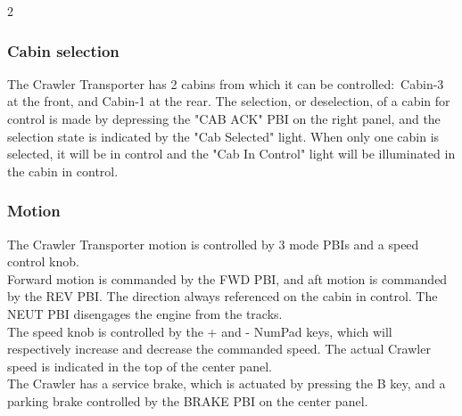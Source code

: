 \documentclass[Space_Shuttle_Vessel_Manual.tex]{subfiles}
\begin{document}
\begin{multicols*}{2}
\subsubsection{Cabin selection}
The Crawler Transporter has 2 cabins from which it can be controlled$\colon$ Cabin-3 at the front, and Cabin-1 at the rear. The selection, or deselection, of a cabin for control is made by depressing the "CAB ACK" PBI on the right panel, and the selection state is indicated by the "Cab Selected" light. When only one cabin is selected, it will be in control and the "Cab In Control" light will be illuminated in the cabin in control.


\subsubsection{Motion}
The Crawler Transporter motion is controlled by 3 mode PBIs and a speed control knob.\\
Forward motion is commanded by the FWD PBI, and aft motion is commanded by the REV PBI. The direction always referenced on the cabin in control. The NEUT PBI disengages the engine from the tracks.\\
The speed knob is controlled by the + and - NumPad keys, which will respectively increase and decrease the commanded speed. The actual Crawler speed is indicated in the top of the center panel.\\
The Crawler has a service brake, which is actuated by pressing the B key, and a parking brake controlled by the BRAKE PBI on the center panel.



\end{multicols*}
\end{document}
